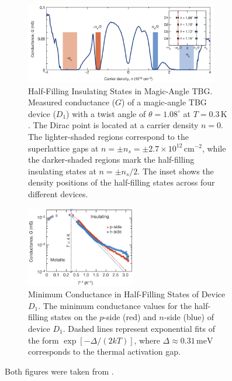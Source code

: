 \begin{figure}[H]
\centering
\begin{subfigure}{.58\textwidth}
  \centering
  \includegraphics[height=9.5em]{fig/tbg_conductance_filling_insulating.png}
  \caption{Half-Filling Insulating States in Magic-Angle TBG. Measured conductance (\(G\)) of a magic-angle TBG device (\(D_1\)) with a twist angle of \(\theta = 1.08^\circ\) at \(T = 0.3 \, \text{K}\). The Dirac point is located at a carrier density \(n = 0\). The lighter-shaded regions correspond to the superlattice gaps at \(n = \pm n_s = \pm 2.7 \times 10^{12} \, \text{cm}^{-2}\), while the darker-shaded regions mark the half-filling insulating states at \(n = \pm n_s/2\). The inset shows the density positions of the half-filling states across four different devices.}
  \label{fig:tbg_conductance_filling_insulating}
\end{subfigure} \hfill
\begin{subfigure}{.40\textwidth}
  \centering
  \includegraphics[height=9.5em]{fig/tbg_conductance_temperature_insulating.png}
  \caption{Minimum Conductance in Half-Filling States of Device \(D_1\). The minimum conductance values for the half-filling states on the \(p\)-side (red) and \(n\)-side (blue) of device \(D_1\). Dashed lines represent exponential fits of the form \(\exp[-\Delta/(2kT)]\), where \(\Delta \approx 0.31 \, \text{meV}\) corresponds to the thermal activation gap.}
  \label{fig:tbg_conductance_temperature_insulating}
\end{subfigure}
\caption{Both figures were taken from \cite{cao2018_correlated}.}
\label{fig:tbg_insulating}
\end{figure}



